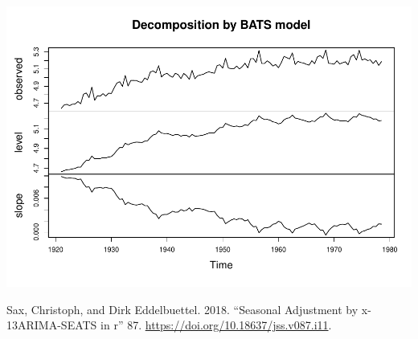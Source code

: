 \documentclass[
]{article}
\newlength{\cslhangindent}
\newlength{\cslentryspacingunit} %
\newenvironment{CSLReferences}[2] %
 {%
  \setlength{\parindent}{0pt}
  \ifodd #1
  \let\oldpar\par
  \def\par{\hangindent=\cslhangindent\oldpar}
  \fi
  \setlength{\parskip}{#2\cslentryspacingunit}
 }%
 {}
\begin{document}
\includegraphics{regressors_of_diwali_seasonality_for_industrial_production_files/figure-latex/unnamed-chunk-15-1.pdf}

\hypertarget{refs}{}
\begin{CSLReferences}{1}{0}
\leavevmode{}%
Sax, Christoph, and Dirk Eddelbuettel. 2018. {``Seasonal Adjustment by
{\textbraceleft}x-13ARIMA-SEATS{\textbraceright} in
{\textbraceleft}r{\textbraceright}''} 87.
\url{https://doi.org/10.18637/jss.v087.i11}.

\end{CSLReferences}
\end{document}
